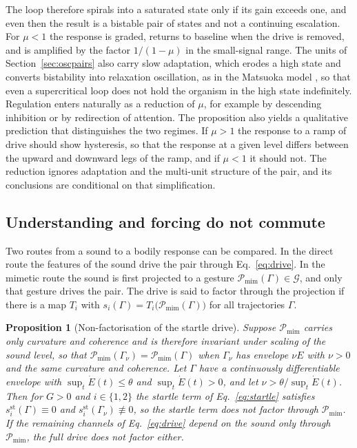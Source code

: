 \documentclass[11pt]{article}
\theoremstyle{plain}
\newtheorem{proposition}{Proposition}
\theoremstyle{definition}
\begin{document}
The loop therefore spirals into a saturated state only if its gain exceeds one, and even then the result is a bistable pair of states and not a continuing escalation. For $\mu<1$ the response is graded, returns to baseline when the drive is removed, and is amplified by the factor $1/(1-\mu)$ in the small-signal range. The units of Section~\ref{sec:oscpairs} also carry slow adaptation, which erodes a high state and converts bistability into relaxation oscillation, as in the Matsuoka model \citep{matsuoka1985}, so that even a supercritical loop does not hold the organism in the high state indefinitely. Regulation enters naturally as a reduction of $\mu$, for example by descending inhibition or by redirection of attention. The proposition also yields a qualitative prediction that distinguishes the two regimes. If $\mu>1$ the response to a ramp of drive should show hysteresis, so that the response at a given level differs between the upward and downward legs of the ramp, and if $\mu<1$ it should not. The reduction ignores adaptation and the multi-unit structure of the pair, and its conclusions are conditional on that simplification.

\subsection{Understanding and forcing do not commute}\label{sec:noncommute}

Two routes from a sound to a bodily response can be compared. In the direct route the features of the sound drive the pair through Eq.~\eqref{eq:drive}. In the mimetic route the sound is first projected to a gesture $\mathcal{P}_{\mathrm{mim}}(\Gamma)\in\mathcal{G}$, and only that gesture drives the pair. The drive is said to factor through the projection if there is a map $T_i$ with $s_i(\Gamma)=T_i\big(\mathcal{P}_{\mathrm{mim}}(\Gamma)\big)$ for all trajectories $\Gamma$.

\begin{proposition}[Non-factorisation of the startle drive]
\label{prop:noncommute}
Suppose $\mathcal{P}_{\mathrm{mim}}$ carries only curvature and coherence and is therefore invariant under scaling of the sound level, so that $\mathcal{P}_{\mathrm{mim}}(\Gamma_\nu)=\mathcal{P}_{\mathrm{mim}}(\Gamma)$ when $\Gamma_\nu$ has envelope $\nu E$ with $\nu>0$ and the same curvature and coherence. Let $\Gamma$ have a continuously differentiable envelope with $\sup_t\dot E(t)\le\theta$ and $\sup_t\dot E(t)>0$, and let $\nu>\theta/\sup_t\dot E(t)$. Then for $G>0$ and $i\in\{1,2\}$ the startle term of Eq.~\eqref{eq:startle} satisfies $s_i^{\mathrm{st}}(\Gamma)\equiv 0$ and $s_i^{\mathrm{st}}(\Gamma_\nu)\not\equiv 0$, so the startle term does not factor through $\mathcal{P}_{\mathrm{mim}}$. If the remaining channels of Eq.~\eqref{eq:drive} depend on the sound only through $\mathcal{P}_{\mathrm{mim}}$, the full drive does not factor either.
\end{proposition}
\end{document}
